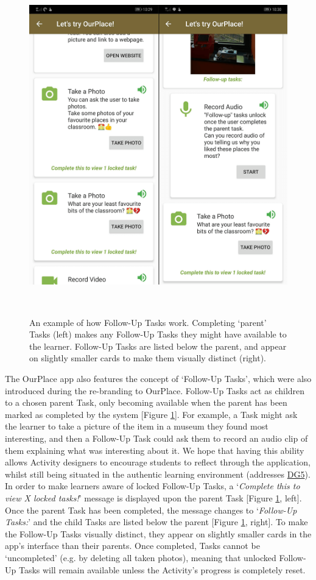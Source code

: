 \begin{figure}
  \centering
  \includegraphics[width=0.6\columnwidth]{images/chapter05/FollowUpTasks.png}
  \caption[Follow-Up Task example]{An example of how Follow-Up Tasks work. Completing `parent' Tasks (left) makes any Follow-Up Tasks they might have available to the learner. Follow-Up Tasks are listed below the parent, and appear on slightly smaller cards to make them visually distinct (right). }~\label{fig:FollowUpTasks}
\end{figure}

The OurPlace app also features the concept of `Follow-Up Tasks', which were also introduced during the re-branding to OurPlace. Follow-Up Tasks act as children to a chosen parent Task, only becoming available when the parent has been marked as completed by the system [Figure \ref{fig:FollowUpTasks}]. For example, a Task might ask the learner to take a picture of the item in a museum they found most interesting, and then a Follow-Up Task could ask them to record an audio clip of them explaining what was interesting about it. We hope that having this ability allows Activity designers to encourage students to reflect through the application, whilst still being situated in the authentic learning environment (addresses \hyperref[DG5]{DG5}). In order to make learners aware of locked Follow-Up Tasks, a `\textit{Complete this to view X locked tasks!}' message is displayed upon the parent Task [Figure \ref{fig:FollowUpTasks}, left]. Once the parent Task has been completed, the message changes to `\textit{Follow-Up Tasks:}' and the child Tasks are listed below the parent [Figure \ref{fig:FollowUpTasks}, right]. To make the Follow-Up Tasks visually distinct, they appear on slightly smaller cards in the app's interface than their parents. Once completed, Tasks cannot be `uncompleted' (e.g. by deleting all taken photos), meaning that unlocked Follow-Up Tasks will remain available unless the Activity's progress is completely reset.


